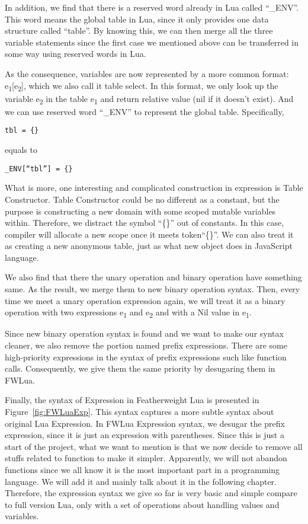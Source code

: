 In addition, we find that there is a reserved word already in Lua called ``\_ENV''. This word means the global table in Lua, since it only provides one data structure called ``table''. By knowing this, we can then merge all the three variable statements since the first case we mentioned above can be transferred in some way using reserved words in Lua.

As the consequence, variables are now represented by a more common format: e\textsubscript{1}[e\textsubscript{2}], which we also call it table select. In this format, we only look up the variable e\textsubscript{2} in the table e\textsubscript{1} and return relative value (nil if it doesn't exist). And we can use reserved word ``\_ENV'' to represent the global table. Specifically,
\begin{flushleft}
\tt tbl = \{\}\\
\end{flushleft}
equals to
\begin{flushleft}
\tt \_ENV[``tbl''] = \{\}\\
\end{flushleft}

What is more, one interesting and complicated construction in expression is Table Constructor. Table Constructor could be no different as a constant, but the purpose is constructing a new domain with some scoped mutable variables within. Therefore, we distract the symbol ``\{\}'' out of constants. In this case, compiler will allocate a new scope once it meets token``\{\}''. We can also treat it as creating a new anonymous table, just as what new object does in JavaScript language.

We also find that there the unary operation and binary operation have something same. As the result, we merge them to new binary operation syntax. Then, every time we meet a unary operation expression again, we will treat it as a binary operation with two expressions e\textsubscript{1} and e\textsubscript{2} and with a Nil value in e\textsubscript{1}.

Since new binary operation syntax is found and we want to make our syntax cleaner, we also remove the portion named prefix expressions. There are some high-priority expressions in the syntax of prefix expressions such like function calls. Consequently, we give them the same priority by desugaring them in FWLua.

Finally, the syntax of Expression in Featherweight Lua is presented in Figure~\ref{fig:FWLuaExp}. This syntax captures a more subtle syntax about original Lua Expression. In FWLua Expression syntax, we desugar the prefix expression, since it is just an expression with parentheses. Since this is just a start of the project, what we want to mention is that we now decide to remove all stuffs related to function to make it simpler. Apparently, we will not abandon functions since we all know it is the most important part in a programming language. We will add it and mainly talk about it in the following chapter. Therefore, the expression syntax we give so far is very basic and simple compare to full version Lua, only with a set of operations about handling values and variables.


